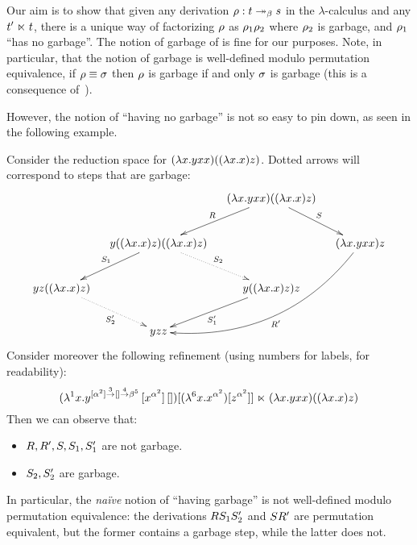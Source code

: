 \bigskip

Our aim is to show that
given any derivation $\rho : t \mathrel{\twoheadrightarrow_\beta} s$ in the $\lambda$-calculus
and any $t' \mathrel{\ltimes} t$,
there is a unique way of factorizing $\rho$ as $\rho_1 \rho_2$
where $\rho_2$ is garbage, and $\rho_1$ ``has no garbage''.
The notion of garbage of  is fine for our purposes.
Note, in particular,
that the notion of garbage is well-defined modulo permutation equivalence,
\ie if $\rho \equiv \sigma$ then $\rho$ is garbage if and only $\sigma$ is garbage
(this is a consequence of~).

However, the notion of ``having no garbage'' is not so easy to pin down,
as seen in the following example.

\begin{example}
  Consider the reduction space for $(\lambda x. yxx)((\lambda x. x)z)$.
  Dotted arrows will correspond to steps that are garbage:
  \[
    \xymatrix@C=.4cm{
      &
      &
      (\lam{\var}{\vartwo\var\var})((\lam{\var}{\var})\varthree)
      \ar_-{\redex}[dl] \ar^-{\redextwo}[dr]
      &
    \\
      &
      \vartwo((\lam{\var}{\var})\varthree)((\lam{\var}{\var})\varthree)
      \ar_-{\redextwo_1}[dl]
      \ar@{.>}^-{\redextwo_2}[dr]
      &
      &
      (\lam{\var}{\vartwo\var\var})\varthree
      \ar@/^1cm/^{\redex'}[ddll]
    \\
      \vartwo\varthree((\lam{\var}{\var})\varthree)
      \ar@{.>}_-{\redextwo'_2}[dr]
      &
      &
      \vartwo((\lam{\var}{\var})\varthree)\varthree
      \ar^-{\redextwo'_1}[dl]
      &
    \\
      &
      \vartwo\varthree\varthree
      &
      &
    }
  \]
  Consider moreover the following refinement (using numbers for labels, for readability):
  \[
    (\lambda^{1} x. y^{[\alpha^{2}] \overset{3}{\to} [] \overset{4}{\to} \beta^{5}}\,[x^{\alpha^2}]\,[])
    [(\lambda^{6} x. x^{\alpha^2})[z^{\alpha^2}]]
    \mathrel{\ltimes}
    (\lambda x. yxx)((\lambda x. x)z)
  \]
  Then we can observe that:
  \begin{itemize}
  \item $R, R', S, S_1, S'_1$ are not garbage.
  \item $S_2, S'_2$ are garbage.
  \end{itemize}
  In particular, the {\em na\"ive} notion of ``having garbage'' is not well-defined modulo permutation equivalence:
  the derivations
  $RS_1S'_2$
  and
  $SR'$
  are permutation equivalent,
  but the former contains a garbage step, while the latter does not.
\end{example}


